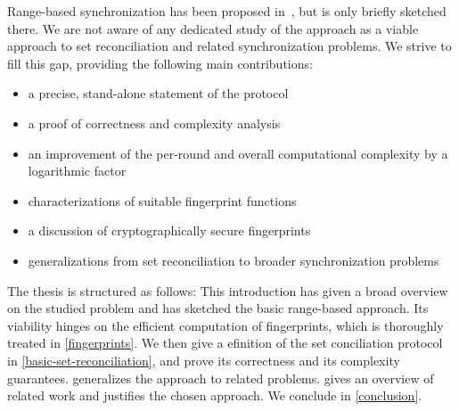 Range-based synchronization has been proposed in~\cite{chen1999prototype}, but is only briefly sketched there. We are not aware of any dedicated study of the approach as a viable approach to set reconciliation and related synchronization problems. We strive to fill this gap, providing the following main contributions:

\begin{itemize}
\item a precise, stand-alone statement of the protocol
\item a proof of correctness and complexity analysis
\item an improvement of the per-round and overall computational complexity by a logarithmic factor
\item characterizations of suitable fingerprint functions
\item a discussion of cryptographically secure fingerprints
\item generalizations from set reconciliation to broader synchronization problems
\end{itemize}

The thesis is structured as follows: This introduction has given a broad overview on the studied problem and has sketched the basic range-based approach. Its viability hinges on the efficient computation of fingerprints, which is thoroughly treated in \cref{fingerprints}. We then give a efinition of the set
conciliation protocol in \cref{basic-set-reconciliation}, and prove its correctness and its
complexity guarantees.  generalizes the approach to related problems. 
gives an overview of related work and justifies the chosen approach. We
conclude in \cref{conclusion}.